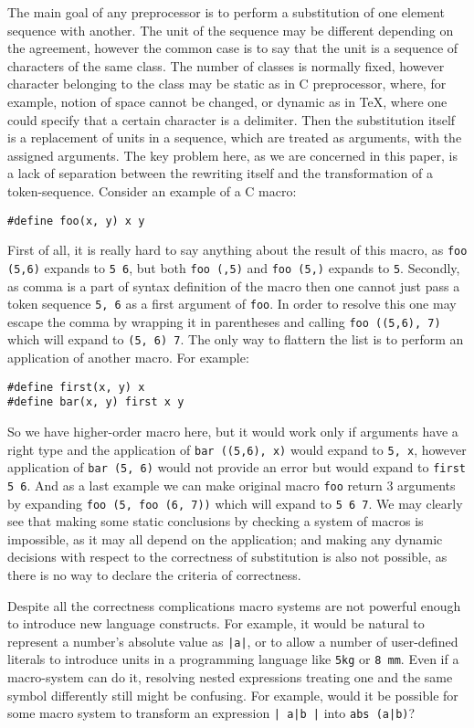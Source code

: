 The main goal of any preprocessor is to perform a substitution of
one element sequence with another.  The unit of the sequence may 
be different depending on the agreement, however the common
case is to say that the unit is a sequence of characters of the
same class.  The number of classes is normally fixed, however 
character belonging to the class may be static as in C preprocessor,
where, for example, notion of space cannot be changed, or dynamic as
in \TeX, where one could specify that a certain character is a 
delimiter.  Then the substitution itself is a replacement of 
units in a sequence, which are treated as arguments, with the 
assigned arguments.  The key problem here, as we are concerned
in this paper, is a lack of separation between the rewriting itself
and the transformation of a token-sequence.  Consider an example of
a C macro:
\begin{verbatim}
#define foo(x, y) x y
\end{verbatim}
First of all, it is really hard to say anything about the result
of this macro, as \verb|foo (5,6)| expands to \verb|5 6|, but
both \verb|foo (,5)| and \verb|foo (5,)| expands to \verb|5|.
Secondly, as comma is a part of syntax definition of the macro
then one cannot just pass a token sequence \verb|5, 6| as a
first argument of \verb|foo|.  In order to resolve this one
may escape the comma by wrapping it in parentheses and calling
\verb|foo ((5,6), 7)| which will expand to \verb|(5, 6) 7|.
The only way to flattern the list is to perform an application
of another macro.  For example:
\begin{verbatim}
#define first(x, y) x
#define bar(x, y) first x y
\end{verbatim}
So we have higher-order macro here, but it would work only if
arguments have a right type and the application of 
\verb|bar ((5,6), x)| would expand to \verb|5, x|, however
application of \verb|bar (5, 6)| would not provide an error
but would expand to \verb|first 5 6|.  And as a last example
we can make original macro \verb|foo| return 3 arguments
by expanding \verb|foo (5, foo (6, 7))| which will expand to
\verb|5 6 7|.  We may clearly see that making some static 
conclusions by checking a system of macros is impossible, as
it may all depend on the application; and making any dynamic
decisions with respect to the correctness of substitution is
also not possible, as there is no way to declare the criteria
of correctness.

Despite all the correctness complications macro systems are not powerful
enough to introduce new language constructs.  For example, it would be natural
to represent a number's absolute value as \verb/|a|/, or to allow a number of
user-defined literals to introduce units in a programming language like 
\verb/5kg/ or \verb|8 mm|.  Even if a macro-system can do it, resolving nested
expressions treating one and the same symbol differently still might be
confusing.  For example, would it be possible for some macro system to
transform an expression \verb/| a|b |/ into \verb/abs (a|b)/?

